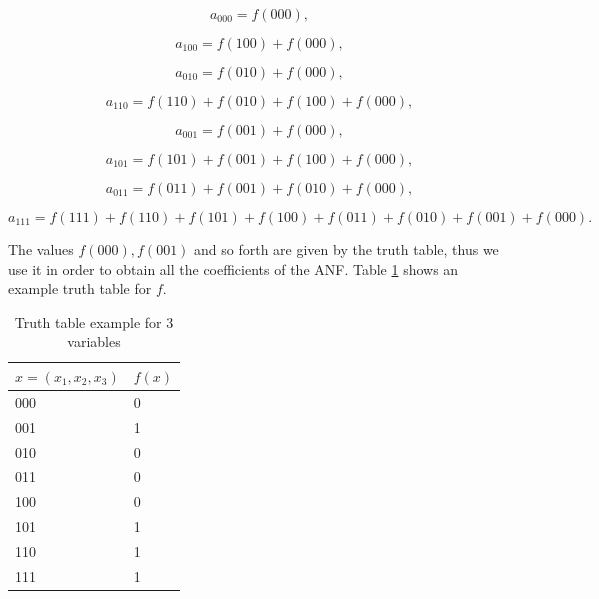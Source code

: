 \documentclass{report}
\begin{document}
\begin{equation*}
    a_{000} = f(000),
\end{equation*}

\begin{equation*}
    a_{100} = f(100) + f(000),
\end{equation*}

\begin{equation*}
    a_{010} = f(010) + f(000),
\end{equation*}

\begin{equation*}
    a_{110} = f(110) + f(010) + f(100) + f(000),
\end{equation*}

\begin{equation*}
    a_{001} = f(001) + f(000),
\end{equation*}

\begin{equation*}
    a_{101} = f(101) + f(001) + f(100) + f(000),
\end{equation*}

\begin{equation*}
    a_{011} = f(011) + f(001) + f(010) + f(000),
\end{equation*}

\begin{equation*}
    a_{111} = f(111) + f(110) + f(101) + f(100) + f(011) + f(010) + f(001) + f(000).
\end{equation*}

The values $f(000), f(001)$ and so forth are given by the truth table, thus we use it in order to obtain all the coefficients of the ANF. Table \ref{tab:truth-table} shows an example truth table for $f$.

\begin{table}[h!]
\centering
\begin{tabular}{|l|l|}
\hline
$x = (x_1, x_2, x_3)$ & $f(x)$ \\ \hline
000                   & 0      \\ \hline
001                   & 1      \\ \hline
010                   & 0      \\ \hline
011                   & 0      \\ \hline
100                   & 0      \\ \hline
101                   & 1      \\ \hline
110                   & 1      \\ \hline
111                   & 1      \\ \hline
\end{tabular}
\caption{Truth table example for 3 variables}
\label{tab:truth-table}
\end{table}
\end{document}
